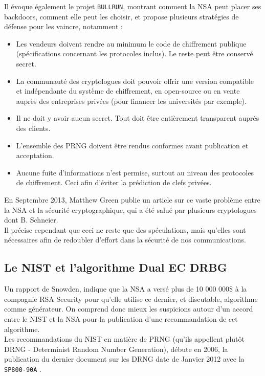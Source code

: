 	Il évoque également le projet \texttt{BULLRUN}, montrant comment la NSA peut placer ses backdoors, comment elle peut les choisir, et propose plusieurs stratégies de défense \cite{schneier2013NSA} pour les vaincre, notamment : 
	\begin{itemize}
	\item Les vendeurs doivent rendre au minimum le code de chiffrement publique (spécifications concernant les protocoles inclus). Le reste peut être conservé secret.
	\item La communauté des cryptologues doit pouvoir offrir une version compatible et indépendante du système de chiffrement, en open-source ou en vente auprès des entreprises privées (pour financer les universités par exemple).
	\item Il ne doit y avoir aucun secret. Tout doit être entièrement transparent auprès des clients. 
	\item L'ensemble des PRNG doivent être rendus conformes avant publication et acceptation.
	\item Aucune fuite d'informations n'est permise, surtout au niveau des protocoles de chiffrement. Ceci afin d'éviter la prédiction de clefs privées.\\
	\end{itemize}
	
	En Septembre 2013, Matthew Green publie un article \cite{green2013NSA} sur ce vaste problème entre la NSA et la sécurité cryptographique, qui a été salué par plusieurs cryptologues dont B. Schneier.\\
	
	Il précise cependant que ceci ne reste que des spéculations, mais qu'elles sont nécessaires afin de redoubler d'effort dans la sécurité de nos communications.\\


	\subsection{Le NIST et l'algorithme Dual EC DRBG}
	
	Un rapport de Snowden, indique que la NSA a versé plus de 10 000 000\$ à la compagnie RSA Security \cite{ravi2013NSA} pour qu'elle utilise ce dernier, et discutable, algorithme comme générateur. On comprend donc mieux les suspicions autour d'un accord entre le NIST et la NSA pour la publication d'une recommandation de cet algorithme.\\	
	
	Les recommandations du NIST en matière de PRNG (qu'ils appellent plutôt DRNG - Determinist Random Number Generation), débute en 2006, la publication du dernier document sur les DRNG date de Janvier 2012 avec la \texttt{SP800-90A} \cite{nist800-90A}.\\

